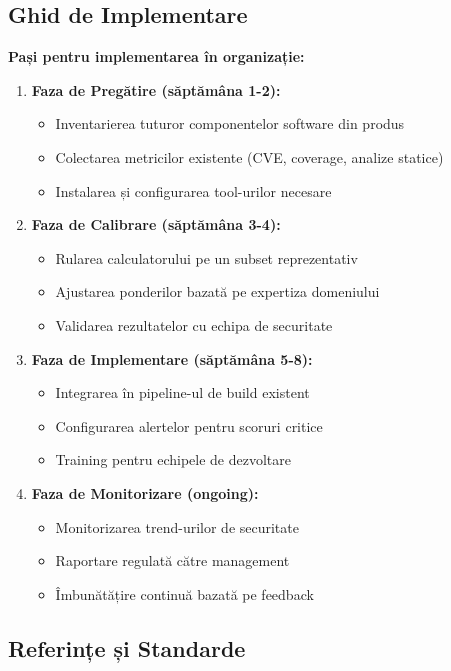 \documentclass[12pt,a4paper]{article}
\begin{document}
\subsection{Ghid de Implementare}

\textbf{Pași pentru implementarea în organizație:}

\begin{enumerate}
\item \textbf{Faza de Pregătire (săptămâna 1-2):}
   \begin{itemize}
   \item Inventarierea tuturor componentelor software din produs
   \item Colectarea metricilor existente (CVE, coverage, analize statice)
   \item Instalarea și configurarea tool-urilor necesare
   \end{itemize}

\item \textbf{Faza de Calibrare (săptămâna 3-4):}
   \begin{itemize}
   \item Rularea calculatorului pe un subset reprezentativ
   \item Ajustarea ponderilor bazată pe expertiza domeniului
   \item Validarea rezultatelor cu echipa de securitate
   \end{itemize}

\item \textbf{Faza de Implementare (săptămâna 5-8):}
   \begin{itemize}
   \item Integrarea în pipeline-ul de build existent
   \item Configurarea alertelor pentru scoruri critice
   \item Training pentru echipele de dezvoltare
   \end{itemize}

\item \textbf{Faza de Monitorizare (ongoing):}
   \begin{itemize}
   \item Monitorizarea trend-urilor de securitate
   \item Raportare regulată către management
   \item Îmbunătățire continuă bazată pe feedback
   \end{itemize}
\end{enumerate}

\subsection{Referințe și Standarde}
\end{document}
